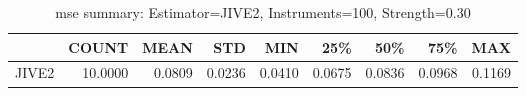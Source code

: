 \begin{table}[ht]
\centering
\caption{mse summary: Estimator=JIVE2, Instruments=100, Strength=0.30}
\begin{tabular}{lrrrrrrrr}
\toprule
 & COUNT & MEAN & STD & MIN & 25\% & 50\% & 75\% & MAX \\
\midrule
JIVE2 & 10.0000 & 0.0809 & 0.0236 & 0.0410 & 0.0675 & 0.0836 & 0.0968 & 0.1169 \\
\bottomrule
\end{tabular}
\end{table}
